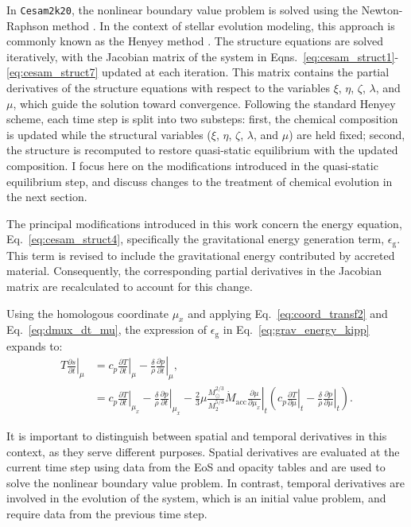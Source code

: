 \documentclass[12pt,a4paper]{article}
\newcommand{\mr}{\mathrm}
\newcommand{\pfird}[2][]{\frac{\partial#1}{\partial#2}}
\begin{document}
In \texttt{Cesam2k20}, the nonlinear boundary value problem is solved using the Newton-Raphson method \parencite{PressEtAl1992}. In the context of stellar evolution modeling, this approach is commonly known as the Henyey method \parencite{HenyeyEtAl1959}. The structure equations are solved iteratively, with the Jacobian matrix of the system in Eqns.~\eqref{eq:cesam_struct1}-\eqref{eq:cesam_struct7} updated at each iteration. This matrix contains the partial derivatives of the structure equations with respect to the variables $\xi$, $\eta$, $\zeta$, $\lambda$, and $\mu$, which guide the solution toward convergence. Following the standard Henyey scheme, each time step is split into two substeps: first, the chemical composition is updated while the structural variables ($\xi$, $\eta$, $\zeta$, $\lambda$, and $\mu$) are held fixed; second, the structure is recomputed to restore quasi-static equilibrium with the updated composition. I focus here on the modifications introduced in the quasi-static equilibrium step, and discuss changes to the treatment of chemical evolution in the next section.

The principal modifications introduced in this work concern the energy equation, Eq.~\eqref{eq:cesam_struct4}, specifically the gravitational energy generation term, $\epsilon_\mr{g}$. This term is revised to include the gravitational energy contributed by accreted material. Consequently, the corresponding partial derivatives in the Jacobian matrix are recalculated to account for this change.

Using the homologous coordinate $\mu_x$ and applying Eq.~\eqref{eq:coord_transf2} and Eq.~\eqref{eq:dmux_dt_mu}, the expression of $\epsilon_\mr{g}$ in Eq.~\eqref{eq:grav_energy_kipp} expands to:
\begin{align}
  T\left.\pfird[s]{t}\right|_\mu &= c_p\left.\pfird[T]{t}\right|_\mu - \frac{\delta}{\rho}\left.\pfird[p]{t}\right|_\mu, \nonumber\\
  &= c_p\left.\pfird[T]{t}\right|_{\mu_x} - \frac{\delta}{\rho}\left.\pfird[p]{t}\right|_{\mu_x} - 
  \frac{2}{3}\mu\frac{M_\odot^{2/3}}{M_2^{5/3}}\dot{M}_\mr{acc}\left.\pfird[\mu]{\mu_x}\right|_t\left(c_p\left.\pfird[T]{\mu}\right|_t - \frac{\delta}{\rho}\left.\pfird[p]{\mu}\right|_t\right). \label{eq:grav_energy_kipp_mux}
\end{align}

It is important to distinguish between spatial and temporal derivatives in this context, as they serve different purposes. Spatial derivatives are evaluated at the current time step using data from the EoS and opacity tables and are used to solve the nonlinear boundary value problem. In contrast, temporal derivatives are involved in the evolution of the system, which is an initial value problem, and require data from the previous time step.
\end{document}
